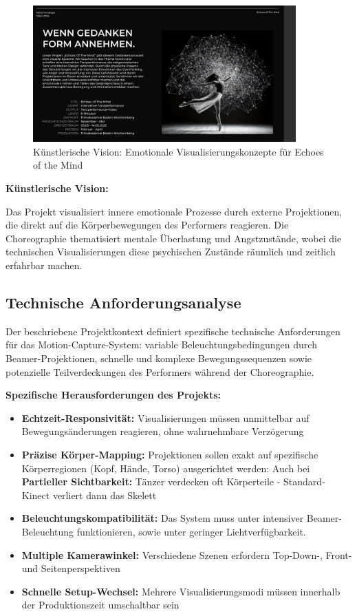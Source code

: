 \begin{figure}[h]
    \centering
    \includegraphics[width=0.9\textwidth]{images/EchoesOfTheMind_mood.png}
    \caption{Künstlerische Vision: Emotionale Visualisierungskonzepte für \glqq Echoes of the Mind\grqq{}}
    \label{fig:echoes_mood}
\end{figure}

\newpage

\textbf{Künstlerische Vision:}

Das Projekt visualisiert innere emotionale Prozesse durch externe Projektionen, die direkt auf die Körperbewegungen des Performers reagieren. Die Choreographie thematisiert mentale Überlastung und Angstzustände, wobei die technischen Visualisierungen diese psychischen Zustände räumlich und zeitlich erfahrbar machen.

\subsection{Technische Anforderungsanalyse}

Der beschriebene Projektkontext definiert spezifische technische Anforderungen für das Motion-Capture-System: variable Beleuchtungsbedingungen durch Beamer-Projektionen, schnelle und komplexe Bewegungssequenzen sowie potenzielle Teilverdeckungen des Performers während der Choreographie. 

\textbf{Spezifische Herausforderungen des Projekts:}

\begin{itemize}
    \item \textbf{Echtzeit-Responsivität:} Visualisierungen müssen unmittelbar auf Bewegungsänderungen reagieren, ohne wahrnehmbare Verzögerung
    \item \textbf{Präzise Körper-Mapping:} Projektionen sollen exakt auf spezifische Körperregionen (Kopf, Hände, Torso) ausgerichtet werden: Auch bei \textbf{Partieller Sichtbarkeit:} Tänzer verdecken oft Körperteile - Standard-Kinect verliert dann das Skelett
    \item \textbf{Beleuchtungskompatibilität:} Das System muss unter intensiver Beamer-Beleuchtung funktionieren, sowie unter geringer Lichtverfügbarkeit.
    \item \textbf{Multiple Kamerawinkel:} Verschiedene Szenen erfordern Top-Down-, Front- und Seitenperspektiven
    \item \textbf{Schnelle Setup-Wechsel:} Mehrere Visualisierungsmodi müssen innerhalb der Produktionszeit umschaltbar sein
\end{itemize}

